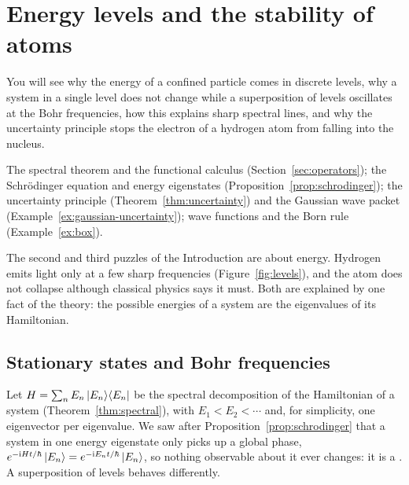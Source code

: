 \section{Energy levels and the stability of atoms}\label{sec:levels}

\begin{objectives}
  You will see why the energy of a confined particle comes in discrete levels, why a system in a single level does not change while a superposition of levels oscillates at the Bohr frequencies, how this explains sharp spectral lines, and why the uncertainty principle stops the electron of a hydrogen atom from falling into the nucleus.
\end{objectives}

\begin{recall}
  The spectral theorem and the functional calculus (Section~\ref{sec:operators}); the Schr\"odinger equation and energy eigenstates (Proposition~\ref{prop:schrodinger}); the uncertainty principle (Theorem~\ref{thm:uncertainty}) and the Gaussian wave packet (Example~\ref{ex:gaussian-uncertainty}); wave functions and the Born rule (Example~\ref{ex:box}).
\end{recall}

The second and third puzzles of the Introduction are about energy. Hydrogen emits light only at a few sharp frequencies (Figure~\ref{fig:levels}), and the atom does not collapse although classical physics says it must. Both are explained by one fact of the theory: the possible energies of a system are the eigenvalues of its Hamiltonian.

\subsection{Stationary states and Bohr frequencies}

Let $H=\sum_nE_n\left|E_n\right\rangle\!\left\langle E_n\right|$ be the spectral decomposition of the Hamiltonian of a system (Theorem~\ref{thm:spectral}), with $E_1<E_2<\cdots$ and, for simplicity, one eigenvector per eigenvalue. We saw after Proposition~\ref{prop:schrodinger} that a system in one energy eigenstate only picks up a global phase, $e^{-\mathrm{i} Ht/\hbar}\left|E_n\right\rangle=e^{-\mathrm{i} E_nt/\hbar}\left|E_n\right\rangle$, so nothing observable about it ever changes: it is a . A superposition of levels behaves differently.


